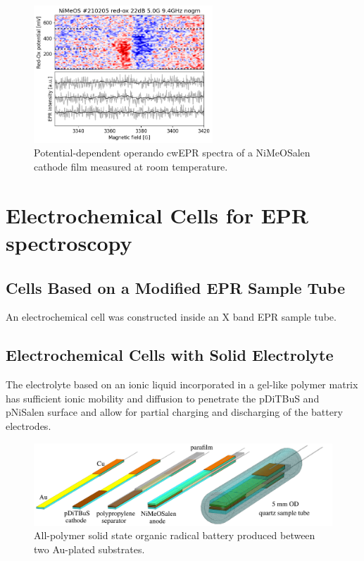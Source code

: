 \begin{figure}[!ht]
\center
	\includegraphics[width=0.6\textwidth]{./operando_epr/figures/backbone/NiMeOS_lyra_overnight_RT.png}
	\caption{Potential-dependent operando cwEPR spectra of a NiMeOSalen cathode film measured at room temperature.}
	\label{fig:cwEPR_RT_NiSalen_OPERANDO}
\end{figure}


\section{Electrochemical Cells for EPR spectroscopy}
\label{sec:operando_cell_fab}

\subsection{Cells Based on a Modified EPR Sample Tube}
An electrochemical cell was constructed inside an X band EPR sample tube.

\subsection{Electrochemical Cells with Solid Electrolyte}
The electrolyte based on an ionic liquid incorporated in a gel-like polymer matrix has sufficient ionic mobility and diffusion to penetrate the pDiTBuS and pNiSalen surface and allow for partial charging and discharging of the battery electrodes.

\begin{figure}[h]
\center
	\includegraphics[width=1\textwidth]{./operando_epr/figures/sandwich/sandwich.pdf}
	\caption{All-polymer solid state organic radical battery produced between two Au-plated substrates.}
	\label{fig:sandwich_assembly}
\end{figure}



